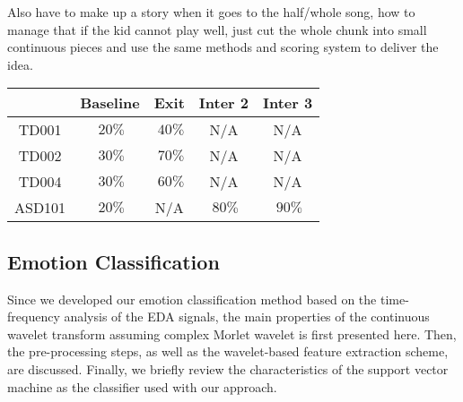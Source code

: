 Also have to make up a story when it goes to the half/whole song, how to manage that
if the kid cannot play well, just cut the whole chunk into small continuous pieces
and use the same methods and scoring system to deliver the idea. \\


\begin{tabular}{ | c | c | c | c | c |  }
	\hline
	& Baseline & Exit & Inter 2 & Inter 3 \\ \hline
	TD001 & $~20\%$ & $~40\%$ & N/A & N/A \\ \hline
	TD002 & $~30\%$ & $~70\%$ & N/A & N/A \\ \hline
	TD004 & $~30\%$ & $~60\%$ & N/A & N/A \\ \hline
	ASD101 & $~20\%$ & N/A & $~80\%$ & $~90\%$ \\ \hline
\end{tabular}\newline

\subsection{Emotion Classification}
Since we developed our emotion classification method based on the time-frequency analysis of the
EDA signals, the main properties of the continuous wavelet transform assuming complex Morlet
wavelet is first presented here. Then, the pre-processing steps, as well as the wavelet-based
feature extraction scheme, are discussed. Finally, we briefly review the characteristics of the
support vector machine as the classifier used with our approach.\\

%
%
